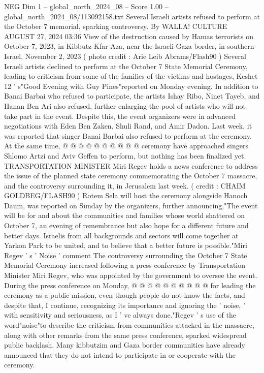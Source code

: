\begin{textsample}{NEG Dim 1 – global\_north\_2024\_08 – Score 1.00 – global\_north\_2024\_08/113092158.txt}  \label{ex:f1_neg_047}
Several Israeli artists refused to perform at the October 7 memorial, sparking controversy.
By WALLA!
CULTURE AUGUST 27, 2024 03:36 View of the destruction caused by Hamas terrorists on October 7, 2023, in Kibbutz Kfar Aza, near the Israeli-Gaza border, in southern Israel, November 2, 2023 ( photo credit : Arie Leib Abrams/Flash90 ) Several Israeli artists declined to perform at the October 7 State Memorial Ceremony, leading to criticism from some of the families of the victims and hostages, Keshet 12 ' s"Good Evening with Guy Pines"reported on Monday evening.
In addition to Banai Barbai who refused to participate, the artists Ishay Ribo, Ninet Tayeb, and Hanan Ben Ari also refused, further enlarging the pool of artists who will not take part in the event.
Despite this, the event organizers were in advanced negotiations with Eden Ben Zaken, Shuli Rand, and Amir Dadon.
Last week, it was reported that singer Banai Barbai also refused to perform at the ceremony.
At the same time, @ @ @ @ @ @ @ @ @ @ ceremony have approached singers Shlomo Artzi and Aviv Geffen to perform, but nothing has been finalized yet.
TRANSPORTATION MINISTER Miri Regev holds a news conference to address the issue of the planned state ceremony commemorating the October 7 massacre, and the controversy surrounding it, in Jerusalem last week. ( credit : CHAIM GOLDBEG/FLASH90 ) Rotem Sela will host the ceremony alongside Hanoch Daum, was reported on Sunday by the organizers, further announcing,"The event will be for and about the communities and families whose world shattered on October 7, an evening of remembrance but also hope for a different future and better days.
Israelis from all backgrounds and sectors will come together at Yarkon Park to be united, and to believe that a better future is possible."Miri Regev ' s ' Noise ' comment The controversy surrounding the October 7 State Memorial Ceremony increased following a press conference by Transportation Minister Miri Regev, who was appointed by the government to oversee the event.
During the press conference on Monday, @ @ @ @ @ @ @ @ @ @ for leading the ceremony as a public mission, even though people do not know the facts, and despite that, I continue, recognizing its importance and ignoring the ' noise, ' with sensitivity and seriousness, as I ' ve always done."Regev ' s use of the word"noise"to describe the criticism from communities attacked in the massacre, along with other remarks from the same press conference, sparked widespread public backlash.
Many kibbutzim and Gaza border communities have already announced that they do not intend to participate in or cooperate with the ceremony.

\end{textsample}
